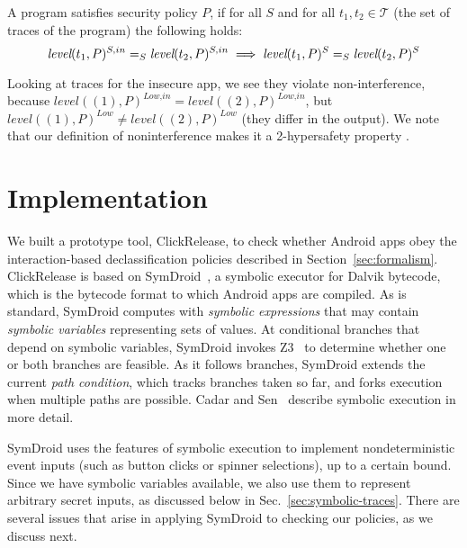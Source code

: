 \documentclass{llncs}
\newcommand{\toolname}{ClickRelease\xspace}
\newcommand{\tr}{t\xspace}
\newcommand{\tset}{\ensuremath{\mathcal{T}}\xspace}
\newcommand{\tleveltr}[2]{\textit{level}(#1, #2)}
\begin{document}
\begin{definition}
  \label{defn:noninterference}
  A program satisfies security policy $P$, if for all $S$ and for
  all $t_1, t_2 \in
      \tset$ (the set of traces of the program) the following holds:
\begin{displaymath}
    \tleveltr{\tr_1}{P}^{S,in} =_S \tleveltr{\tr_2}{P}^{S,in}
    \implies
    \tleveltr{\tr_1}{P}^S =_S \tleveltr{\tr_2}{P}^S \\
\end{displaymath}
\end{definition}

Looking at traces for the insecure app, we see
they violate non-interference, because
$\tleveltr{(1)}{P}^\textit{Low,in} =
\tleveltr{(2)}{P}^\textit{Low,in}$, but
$\tleveltr{(1)}{P}^\textit{Low} \neq \tleveltr{(2)}{P}^\textit{Low}$
(they differ in the output).  We note that our definition of
noninterference makes it a 2-hypersafety property \cite{Clarkson:10,Clarkson:2014}.

\section{Implementation}
\label{sec:implementation}

We built a prototype tool, \toolname{}, to check whether Android apps obey the
interaction-based declassification policies described in
Section~\ref{sec:formalism}. \toolname{} is based on
SymDroid~\cite{Jeon:2012}, a symbolic executor for Dalvik bytecode,
which is the bytecode format to which Android apps are compiled.
As is standard, SymDroid computes with \emph{symbolic
  expressions} that may contain \emph{symbolic variables}
representing sets of values. At conditional branches that depend on
symbolic variables, SymDroid invokes Z3~\cite{deMoura:2008} to
determine whether one or both branches are feasible. As it follows
branches, SymDroid extends the current \emph{path condition}, which tracks
branches taken so far, and forks execution when multiple paths are
possible. Cadar and Sen~\cite{Cadar:13} describe
symbolic execution in more detail.

SymDroid uses the features of symbolic execution to implement
nondeterministic event inputs (such as button clicks or spinner
selections), up to a certain bound. Since we have symbolic variables
available, we also use them to represent arbitrary secret inputs, as
discussed below in Sec.~\ref{sec:symbolic-traces}. There are several issues that arise in applying SymDroid
to checking our policies, as we discuss next.
\end{document}
